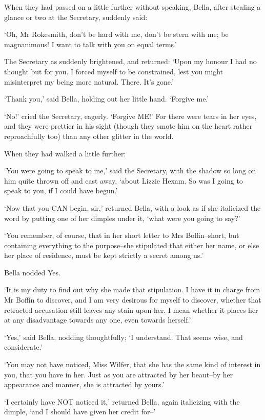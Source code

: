 When they had passed on a little further without speaking, Bella, after
stealing a glance or two at the Secretary, suddenly said:

‘Oh, Mr Rokesmith, don’t be hard with me, don’t be stern with me; be
magnanimous! I want to talk with you on equal terms.’

The Secretary as suddenly brightened, and returned: ‘Upon my honour I
had no thought but for you. I forced myself to be constrained, lest you
might misinterpret my being more natural. There. It’s gone.’

‘Thank you,’ said Bella, holding out her little hand. ‘Forgive me.’

‘No!’ cried the Secretary, eagerly. ‘Forgive ME!’ For there were tears
in her eyes, and they were prettier in his sight (though they smote him
on the heart rather reproachfully too) than any other glitter in the
world.

When they had walked a little further:

‘You were going to speak to me,’ said the Secretary, with the shadow so
long on him quite thrown off and cast away, ‘about Lizzie Hexam. So was
I going to speak to you, if I could have begun.’

‘Now that you CAN begin, sir,’ returned Bella, with a look as if she
italicized the word by putting one of her dimples under it, ‘what were
you going to say?’

‘You remember, of course, that in her short letter to Mrs Boffin--short,
but containing everything to the purpose--she stipulated that either
her name, or else her place of residence, must be kept strictly a secret
among us.’

Bella nodded Yes.

‘It is my duty to find out why she made that stipulation. I have it in
charge from Mr Boffin to discover, and I am very desirous for myself to
discover, whether that retracted accusation still leaves any stain upon
her. I mean whether it places her at any disadvantage towards any one,
even towards herself.’

‘Yes,’ said Bella, nodding thoughtfully; ‘I understand. That seems wise,
and considerate.’

‘You may not have noticed, Miss Wilfer, that she has the same kind of
interest in you, that you have in her. Just as you are attracted by her
beaut--by her appearance and manner, she is attracted by yours.’

‘I certainly have NOT noticed it,’ returned Bella, again italicizing
with the dimple, ‘and I should have given her credit for--’

